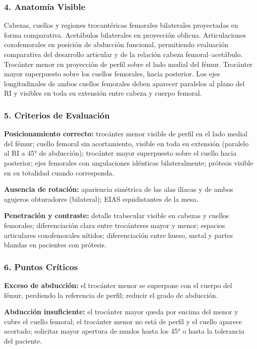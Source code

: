 	\subsubsection*{4. Anatomía Visible}
	
	Cabezas, cuellos y regiones trocantéricas femorales bilaterales proyectadas en forma comparativa. Acetábulos bilaterales en proyección oblicua. Articulaciones coxofemorales en posición de abducción funcional, permitiendo evaluación comparativa del desarrollo articular y de la relación cabeza femoral--acetábulo. Trocánter menor en proyección de perfil sobre el lado medial del fémur. Trocánter mayor superpuesto sobre los cuellos femorales, hacia posterior. Los ejes longitudinales de ambos cuellos femorales deben aparecer paralelos al plano del RI y visibles en toda su extensión entre cabeza y cuerpo femoral.
	
	\subsubsection*{5. Criterios de Evaluación}
	
	\textbf{Posicionamiento correcto:} trocánter menor visible de perfil en el lado medial del fémur; cuello femoral sin acortamiento, visible en toda su extensión (paralelo al RI a 45° de abducción); trocánter mayor superpuesto sobre el cuello hacia posterior; ejes femorales con angulaciones idénticas bilateralmente; prótesis visible en su totalidad cuando corresponda.
	
	\textbf{Ausencia de rotación:} apariencia simétrica de las alas ilíacas y de ambos agujeros obturadores (bilateral); EIAS equidistantes de la mesa.
	
	\textbf{Penetración y contraste:} detalle trabecular visible en cabezas y cuellos femorales; diferenciación clara entre trocánteres mayor y menor; espacios articulares coxofemorales nítidos; diferenciación entre hueso, metal y partes blandas en pacientes con prótesis.
	
	\subsubsection*{6. Puntos Críticos}
	
	\textbf{Exceso de abducción:} el trocánter menor se superpone con el cuerpo del fémur, perdiendo la referencia de perfil; reducir el grado de abducción.
	
	\textbf{Abducción insuficiente:} el trocánter mayor queda por encima del menor y cubre el cuello femoral; el trocánter menor no está de perfil y el cuello aparece acortado; solicitar mayor apertura de muslos hasta los 45° o hasta la tolerancia del paciente.
	
